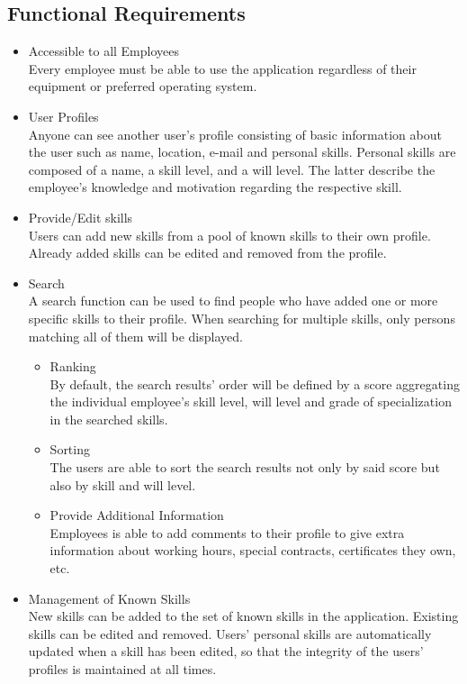 \subsection{Functional Requirements}
\begin{itemize}
 	\item Accessible to all Employees\\
	Every employee must be able to use the application regardless of their equipment or preferred operating system.
	\item User Profiles \\
	Anyone can see another user’s profile consisting of basic information about the user such as name, location, e-mail and personal skills. Personal skills are composed of a name, a skill level, and a will level. The latter describe the employee's knowledge and motivation regarding the respective skill.
	\item Provide/Edit skills\\
	Users can add new skills from a pool of known skills to their own profile. Already added skills can be edited and removed from the profile.
	\item Search\\
	A search function can be used to find people who have added one or more specific skills to their profile. When searching for multiple skills, only persons matching all of them will be displayed.
	\begin{itemize}
		\item Ranking\\
			By default, the search results' order will be defined by a score aggregating the individual employee's skill level, will level and grade of specialization in the searched skills.
		\item Sorting\\
			The users are able to sort the search results not only by said score
			but also by skill and will level.
	\item Provide Additional Information\\
			Employees is able to add comments to their profile to give extra information about working hours, special contracts, certificates they own, etc.
	\end{itemize}
	\item Management of Known Skills\\
	New skills can be added to the set of known skills in the application. Existing skills can be edited and removed. Users' personal skills are automatically updated when a skill has been edited, so that the integrity of the users' profiles is maintained at all times.
\end{itemize}

